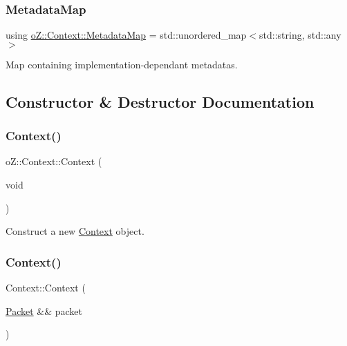 \subsubsection{\texorpdfstring{MetadataMap}{MetadataMap}}
{\footnotesize\ttfamily using \mbox{\hyperlink{classo_z_1_1_context_a27f05cdc375f513979a6080896cf9496}{o\+Z\+::\+Context\+::\+Metadata\+Map}} =  std\+::unordered\+\_\+map$<$std\+::string, std\+::any$>$}



Map containing implementation-\/dependant metadatas. 



\subsection{Constructor \& Destructor Documentation}
\mbox{\label{classo_z_1_1_context_af3aab1b32d4333320612049bdafb07d7}} 
\subsubsection{\texorpdfstring{Context()}{Context()}\hspace{0.1cm}{\footnotesize\ttfamily [1/4]}}
{\footnotesize\ttfamily o\+Z\+::\+Context\+::\+Context (\begin{DoxyParamCaption}\item[{void}]{ }\end{DoxyParamCaption})\hspace{0.3cm}{\ttfamily [default]}}



Construct a new \mbox{\hyperlink{classo_z_1_1_context}{Context}} object. 

\mbox{\label{classo_z_1_1_context_aa57df3d21eacc6e149f9c61c0c3f196b}} 
\subsubsection{\texorpdfstring{Context()}{Context()}\hspace{0.1cm}{\footnotesize\ttfamily [2/4]}}
{\footnotesize\ttfamily Context\+::\+Context (\begin{DoxyParamCaption}\item[{\mbox{\hyperlink{classo_z_1_1_packet}{Packet}} \&\&}]{packet }\end{DoxyParamCaption})}



